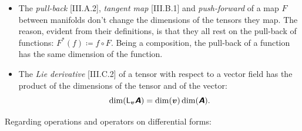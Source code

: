 \documentclass[\ifafour a4paper,12pt,\else a5paper,10pt,\fi%
onecolumn,oneside,article,%
british%
]{memoir}
\theoremstyle{remark}
\theoremstyle{innote}
\newcommand*{\mathte}[1]{\textbf{\textit{\textsf{#1}}}}
\newcommand*{\defd}{\coloneqq}
\renewcommand*{\|}[1][]{\nonscript\,#1\vert\nonscript\;\mathopen{}}
\newcommand*{\Li}{\textsf{L}}
\newcommand*{\yA}{\mathte{A}}
\newcommand*{\yB}{\mathte{B}}
\newcommand*{\yv}{\bm{v}}
\begin{document}
\begin{itemize}[wide=0pt]
\smallskip

\item The \emph{pull-back} [III.A.2], \emph{tangent map} [III.B.1] and
  \emph{push-forward} of a map $F$ between manifolds don't change the
  dimensions of the tensors they map. The reason, evident from their
  definitions, is that they all rest on the pull-back of functions:
  $F^{*}(f) \defd f\circ F$. Being a composition, the pull-back of a
  function has the same dimension of the function.

\smallskip

\item The \emph{Lie derivative} [III.C.2] of a tensor with respect to a
  vector field has the product of the dimensions of the tensor and of the
  vector:
  \begin{equation}
    \dim(\Li_{\yv}\yA) =\dim(\yv)\dim(\yA).
    \label{eq:lie_der}
\end{equation}
\end{itemize}

\medskip

Regarding operations and operators on differential forms:
\end{document}
